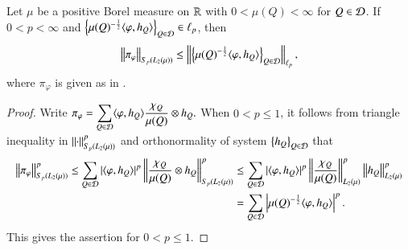 \documentclass[leqno]{amsart}
\begin{document}
\begin{lemma}\label{paraproduct Sp}
Let $\mu$ be a positive Borel measure on ${\mathbb R}$ with $0<\mu(Q)<\infty$ for $Q\in{\mathcal D}$. If $0<p<\infty$ and $\left\{ \mu(Q)^{-\frac{1}{2}}\langle \varphi,h_{Q} \rangle \right\}_{Q\in{\mathcal D}}\in\ell_{p}$, then
$$\left\| \pi_{\varphi} \right\|_{S_{p}(L_{2}(\mu))}
\leq\left\| \left\{ \mu(Q)^{-\frac{1}{2}}\langle \varphi,h_{Q} \rangle \right\}_{Q\in{\mathcal D}} \right\|_{\ell_{p}},$$
where $\pi_{\varphi}$ is given as in .
\end{lemma}
\begin{proof}
Write
$\displaystyle\pi_{\varphi}
=\sum_{Q\in{\mathcal D}}\langle \varphi,h_{Q} \rangle\frac{\chi_{Q}}{\mu(Q)}\otimes h_{Q}.$ 
When $0<p\leq1$, it follows from triangle inequality in $\left\| \cdot \right\|_{S_{p}(L_{2}(\mu))}^{p}$ and orthonormality of system $\left\{ h_{Q} \right\}_{Q\in{\mathcal D}}$ that
\begin{align*}
\left\| \pi_{\varphi} \right\|_{S_{p}(L_{2}(\mu))}^{p}
\leq\sum_{Q\in{\mathcal D}}|\langle \varphi,h_{Q} \rangle|^{p}
\left\| \frac{\chi_{Q}}{\mu(Q)}\otimes h_{Q} \right\|_{S_{p}(L_{2}(\mu))}^{p}
&\leq\sum_{Q\in{\mathcal D}}|\langle \varphi,h_{Q} \rangle|^{p}
\left\| \frac{\chi_{Q}}{\mu(Q)} \right\|_{L_{2}(\mu)}^{p}\left\| h_{Q} \right\|_{L_{2}(\mu)}^{p}\\
&=\sum_{Q\in{\mathcal D}}\left|\mu(Q)^{-\frac{1}{2}}\langle \varphi,h_{Q} \rangle\right|^{p}.
\end{align*}
This gives the assertion for $0<p\leq1$.


\end{proof}
\end{document}
